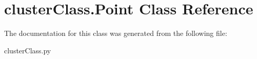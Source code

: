 \hypertarget{classclusterClass_1_1Point}{\section{cluster\-Class.\-Point Class Reference}
\label{classclusterClass_1_1Point}
}


The documentation for this class was generated from the following file\-:\begin{DoxyCompactItemize}
\item 
cluster\-Class.\-py\end{DoxyCompactItemize}
